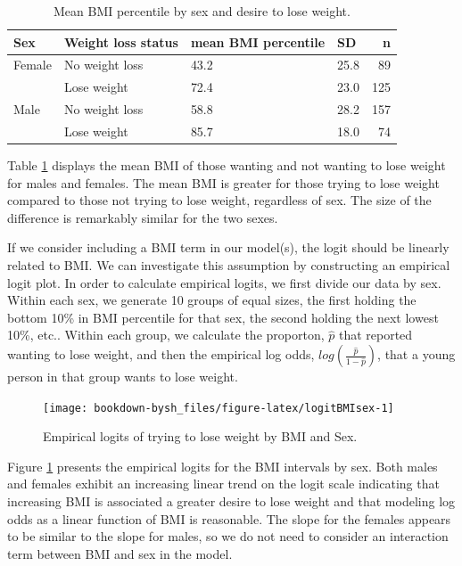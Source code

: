 \documentclass[
]{krantz}
\begin{document}
\begin{table}

\caption{\label{tab:table3chp6}Mean BMI percentile by sex and desire to lose weight.}
\centering
\begin{tabular}[t]{llllr}
\toprule
Sex & Weight loss status & mean BMI percentile & SD & n\\
\midrule
Female & No weight loss & 43.2 & 25.8 & 89\\
 & Lose weight & 72.4 & 23.0 & 125\\
Male & No weight loss & 58.8 & 28.2 & 157\\
 & Lose weight & 85.7 & 18.0 & 74\\
\bottomrule
\end{tabular}
\end{table}

Table \ref{tab:table3chp6} displays the mean BMI of those wanting and not wanting to lose weight for males and females. The mean BMI is greater for those trying to lose weight compared to those not trying to lose weight, regardless of sex. The size of the difference is remarkably similar for the two sexes.

If we consider including a BMI term in our model(s), the logit should be linearly related to BMI. We can investigate this assumption by constructing an empirical logit plot. In order to calculate empirical logits, we first divide our data by sex. Within each sex, we generate 10 groups of equal sizes, the first holding the bottom 10\% in BMI percentile for that sex, the second holding the next lowest 10\%, etc.. Within each group, we calculate the proporton, \(\hat{p}\) that reported wanting to lose weight, and then the empirical log odds, \(log(\frac{\hat{p}}{1-\hat{p}})\), that a young person in that group wants to lose weight.

\begin{figure}

{\centering \texttt{[image: bookdown-bysh\_files/figure-latex/logitBMIsex-1]} 

}

\caption{Empirical logits of trying to lose weight by BMI and Sex.}\label{fig:logitBMIsex}
\end{figure}

Figure \ref{fig:logitBMIsex} presents the empirical logits for the BMI intervals by sex. Both males and females exhibit an increasing linear trend on the logit scale indicating that increasing BMI is associated a greater desire to lose weight and that modeling log odds as a linear function of BMI is reasonable. The slope for the females appears to be similar to the slope for males, so we do not need to consider an interaction term between BMI and sex in the model.
\end{document}
